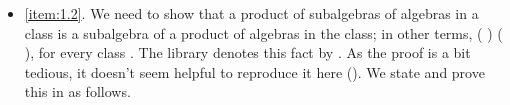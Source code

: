 \begin{itemize}
\fi

\item \noindent \ref{item:1.2}. We need to show that a product of subalgebras of algebras in a class is a subalgebra of a product of algebras in the class;
in other terms,  ( )   ( ), for every class .
\ifshort
The \agdaalgebras library denotes this fact by .
As the proof is a bit tedious, it doesn't seem helpful to reproduce it here (\seeshort).
\else
We state and prove this in \agda as follows.

\begin{code}%
\>[0]\<%
\\
\>[0][@{}l@{\AgdaIndent{1}}]%
\>[1]\AgdaSpace{}%
\AgdaSymbol{:}\AgdaSpace{}%
\AgdaSpace{}%
\AgdaSpace{}%
\AgdaSpace{}%
\AgdaSymbol{(}\AgdaSymbol{\{}\AgdaSpace{}%
\AgdaSymbol{=}\AgdaSpace{}%
\AgdaSymbol{\}\{}\AgdaSymbol{\}}\AgdaSpace{}%
\AgdaSpace{}%
\AgdaSymbol{)}\AgdaSpace{}%
\AgdaSpace{}%
\AgdaSpace{}%
\AgdaSpace{}%
\AgdaSymbol{(}\AgdaSpace{}%
\AgdaSpace{}%
\AgdaSpace{}%
\AgdaSymbol{)}\<%
\\
%
\>[1]\AgdaSpace{}%
\AgdaSymbol{\{}\AgdaSymbol{\}}\AgdaSpace{}%
\AgdaSymbol{(}\AgdaSpace{}%
\AgdaOperator{\AgdaInductiveConstructor{,}}\AgdaSpace{}%
\AgdaSymbol{(}\AgdaSpace{}%
\AgdaSpace{}%
\AgdaOperator{\AgdaInductiveConstructor{,}}\AgdaSpace{}%
\AgdaSpace{}%
\AgdaOperator{\AgdaInductiveConstructor{,}}\AgdaSpace{}%
\AgdaSpace{}%
\AgdaSymbol{))}\AgdaSpace{}%
\AgdaSymbol{=}\AgdaSpace{}%
\<%
\\
\>[1][@{}l@{\AgdaIndent{0}}]%
\>[2]\<%
\\
%
\>[2]\AgdaSpace{}%
\AgdaSymbol{:}\AgdaSpace{}%
\AgdaSpace{}%
\AgdaSpace{}%
\AgdaSpace{}%
\AgdaSpace{}%
\<%
\\
%
\>[2]\AgdaSpace{}%
\AgdaSpace{}%
\AgdaSymbol{=}\AgdaSpace{}%
\AgdaSpace{}%
\AgdaSpace{}%
\AgdaSpace{}%
\<%

\end{code}
\end{itemize}
